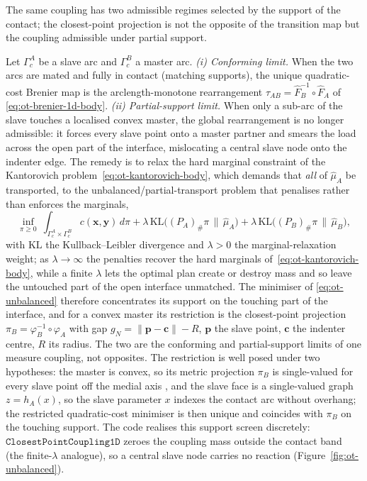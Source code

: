 \documentclass{svjour3}                 %
\newcommand{\norm}[1]{\lVert#1\rVert}
\newcommand{\xbf}{\bm{x}}
\newcommand{\ybf}{\bm{y}}
\newcommand{\gn}{g_{\scriptscriptstyle N}}
\newcommand{\tmap}{\tau_{AB}}
\newcommand{\map}[1]{\varphi_{#1}}
\newcommand{\code}[1]{\texttt{#1}}
\begin{document}
The same coupling has two admissible regimes selected by the support of the contact; the closest-point
projection is not the opposite of the transition map but the coupling admissible under partial support.

\begin{remark}\label{rem:ot-limits}
Let $\Gamma_c^A$ be a slave arc and $\Gamma_c^B$ a master arc.
\emph{(i) Conforming limit.} When the two arcs are mated and fully in contact (matching supports), the unique
quadratic-cost Brenier map is the arclength-monotone rearrangement $\tmap=\hat F_B^{-1}\circ\hat F_A$ of
\eqref{eq:ot-brenier-1d-body}.
\emph{(ii) Partial-support limit.} When only a sub-arc of the slave touches a localised convex master, the global
rearrangement is no longer admissible: it forces every slave point onto a master partner and smears the load
across the open part of the interface, mislocating a central slave node onto the indenter edge. The remedy is to
relax the hard marginal constraint of the Kantorovich problem~\eqref{eq:ot-kantorovich-body}, which demands that
\emph{all} of $\hat\mu_A$ be transported, to the unbalanced/partial-transport problem
\citep{chizat2018unbalanced} that penalises rather than enforces the marginals,
\begin{equation}\label{eq:ot-unbalanced}
\inf_{\pi\ge0}\ \int_{\Gamma_c^A\times\Gamma_c^B}\!\! c(\xbf,\ybf)\,d\pi
+\lambda\,\mathrm{KL}\!\big((P_A)_\#\pi\,\|\,\hat\mu_A\big)
+\lambda\,\mathrm{KL}\!\big((P_B)_\#\pi\,\|\,\hat\mu_B\big),
\end{equation}
with $\mathrm{KL}$ the Kullback--Leibler divergence and $\lambda>0$ the marginal-relaxation weight; as $\lambda\to\infty$
the penalties recover the hard marginals of~\eqref{eq:ot-kantorovich-body}, while a finite $\lambda$ lets the optimal
plan create or destroy mass and so leave the untouched part of the open interface unmatched. The minimiser of
\eqref{eq:ot-unbalanced} therefore concentrates its support on the touching part of the interface, and for a
convex master its restriction is the closest-point projection $\pi_B=\map{B}^{-1}\circ\map{A}$ with gap
$\gn=\norm{\bm p-\bm c}-R$, $\bm p$ the slave point, $\bm c$ the indenter centre, $R$ its radius. The two are the
conforming and partial-support limits of one measure coupling, not opposites. The restriction is well posed
under two hypotheses: the master is convex, so its metric projection $\pi_B$ is single-valued for every slave
point off the medial axis \citep[\S1.3]{santambrogio2015optimal}, and the slave face is a
single-valued graph $z=h_A(x)$, so the slave parameter $x$ indexes the contact arc without overhang; the
restricted quadratic-cost minimiser is then unique and coincides with $\pi_B$ on the touching support. The
code realises this support screen discretely: $\code{ClosestPointCoupling1D}$ zeroes the coupling mass outside the
contact band (the finite-$\lambda$ analogue), so a central slave node carries no reaction
(Figure~\ref{fig:ot-unbalanced}).
\end{remark}
\end{document}
